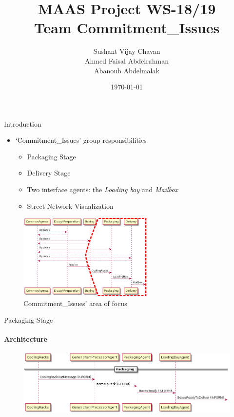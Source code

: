 \documentclass[9pt, aspectratio=169]{beamer}
\title{MAAS Project WS-18/19 \\ Team Commitment\_Issues}
\author{Sushant Vijay Chavan\\Ahmed Faisal Abdelrahman\\Abanoub Abdelmalak}
\date{\today}
\let\olditem=\item%
\renewcommand{\item}{\olditem \justifying}%
\begin{document}
\maketitle

\begin{frame}{Introduction}
	\begin{itemize}
		\item `Commitment\_Issues' group responsibilities
		\begin{itemize}
			\item Packaging Stage
			\item Delivery Stage
			\item Two interface agents: the \textit{Loading bay} and \textit{Mailbox}
			\item Street Network Visualization
		\end{itemize}
	\end{itemize}
	
	\begin{figure}[h!]
	\centering
	\includegraphics[width=0.6\textwidth]{Architecture_Stages.png}
	\caption{Commitment\_Issues' area of focus}
\end{figure}
\end{frame}

\begin{frame}{Packaging Stage}
\framesubtitle{Architecture}
\begin{figure}[h!]
	\centering
	\includegraphics[width=\textwidth]{../Architecture/Architecture_Packaging.png}
\end{figure}
\end{frame}
\end{document}
